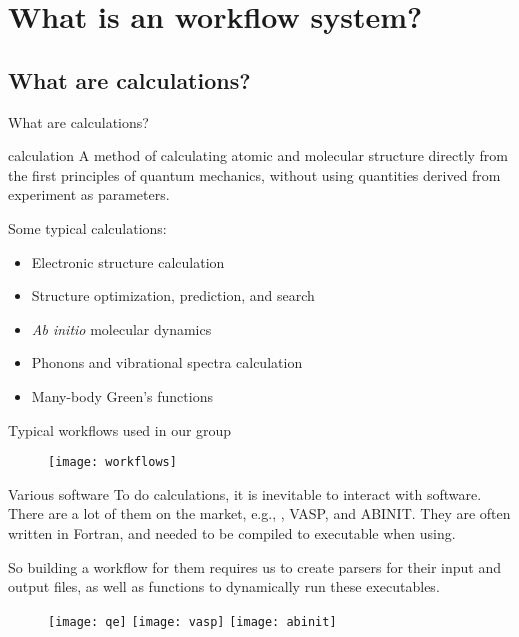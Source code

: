 \section{What is an \ab{} workflow system?}

\subsection{What are \ab{} calculations?}

\begin{frame}{What are \ab{} calculations?}
    \begin{definitionblock}{\ab{} calculation}
        A method of calculating atomic and molecular structure directly from the first
        principles of quantum mechanics, without using quantities derived from experiment
        as parameters.
    \end{definitionblock}

    Some typical \ab{} calculations:
    \begin{itemize}
        \item Electronic structure calculation
        \item Structure optimization, prediction, and search
        \item \textit{Ab initio} molecular dynamics
        \item Phonons and vibrational spectra calculation
        \item Many-body Green's functions
    \end{itemize}
\end{frame}

\begin{frame}{Typical \ab{} workflows used in our group}
    \begin{figure}[H]
        \centering
        \texttt{[image: workflows]}
        \label{eq:workflows}
    \end{figure}
\end{frame}

\begin{frame}{Various \ab{} software}
    To do \ab{} calculations, it is inevitable to interact with \ab{} software.
    There are a lot of them on the market, e.g., \qe{}, VASP, and ABINIT.
    They are often written in Fortran, and needed to be compiled to executable
    when using.

    So building a workflow for them requires us to create parsers for their input and output
    files, as well as functions to dynamically run these executables.

    \begin{figure}[b]
        \centering
        \texttt{[image: qe]}
        \hfill
        \texttt{[image: vasp]}
        \hfill
        \texttt{[image: abinit]}
        \label{fig:abinitsoftware}
    \end{figure}
\end{frame}
